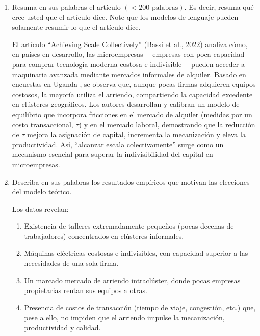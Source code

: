 \documentclass{article}
\theoremstyle{remark}
\theoremstyle{definition}
\begin{document}
\begin{enumerate}[label= (\roman*)]
\item Resuma en sus palabras el art\'iculo $(<200\text{ palabras})$. Es decir, resuma qu\'e cree usted que el art\'iculo dice. Note que los modelos de lenguaje pueden solamente resumir lo que el art\'iculo dice.

    \begin{tcolorbox}

    El artículo “Achieving Scale Collectively” (Bassi et al., 2022) analiza cómo, en países en desarrollo, las microempresas —empresas con poca capacidad para comprar tecnología moderna costosa e indivisible— pueden acceder a maquinaria avanzada mediante mercados informales de alquiler. Basado en encuestas en Uganda , se observa que, aunque pocas firmas adquieren equipos costosos, la mayoría utiliza el arriendo, compartiendo la capacidad excedente en clústeres geográficos. Los autores desarrollan y calibran un modelo de equilibrio que incorpora fricciones en el mercado de alquiler (medidas por un costo transaccional, $\tau$) y en el mercado laboral, demostrando que la reducción de $\tau$ mejora la asignación de capital, incrementa la mecanización y eleva la productividad. Así, ``alcanzar escala colectivamente'' surge como un mecanismo esencial para superar la indivisibilidad del capital en microempresas.
        
    \end{tcolorbox}


\item Describa en sus palabras los resultados emp\'iricos que motivan las elecciones del modelo te\'orico.

     \begin{tcolorbox}

     Los datos revelan:
    \begin{enumerate}
        \item Existencia de talleres extremadamente pequeños (pocas decenas de trabajadores) concentrados en clústeres informales.
        \item Máquinas eléctricas costosas e indivisibles, con capacidad superior a las necesidades de una sola firma.
        \item Un marcado mercado de arriendo intraclúster, donde pocas empresas propietarias rentan sus equipos a otras.
        \item Presencia de costos de transacción (tiempo de viaje, congestión, etc.) que, pese a ello, no impiden que el arriendo impulse la mecanización, productividad y calidad.
    \end{enumerate}
        

\end{tcolorbox}
\end{enumerate}
\end{document}
